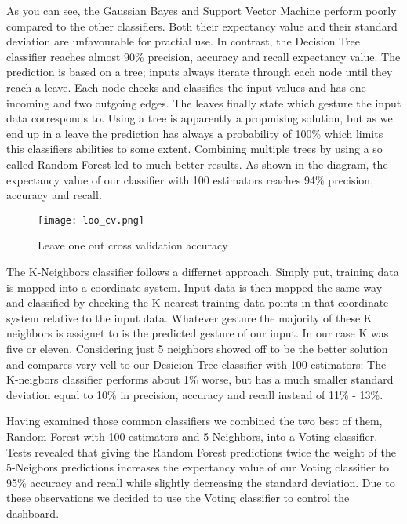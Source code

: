 As you can see, the Gaussian Bayes and Support Vector Machine perform poorly compared to the other classifiers. Both their expectancy value and their standard deviation are unfavourable for practial use. In contrast, the Decision Tree classifier reaches almost 90\% precision, accuracy and recall expectancy value. The prediction is based on a tree; inputs always iterate through each node until they reach a leave. Each node checks and classifies the input values and has one incoming and two outgoing edges. The leaves finally state which gesture the input data corresponds to. Using a tree is apparently a propmising solution, but as we end up in a leave the prediction has always a probability of 100\% which limits this classifiers abilities to some extent. Combining multiple trees by using a so called Random Forest led to much better results. As shown in the diagram, the expectancy value of our classifier with 100 estimators reaches 94\% precision, accuracy and recall. 

\begin{wrapfigure}{R}{0.4\textwidth}
\centering
\texttt{[image: loo\_cv.png]}
\caption{Leave one out cross validation accuracy}\label{fig:loo}
\end{wrapfigure}

The K-Neighbors classifier follows a differnet approach. Simply put, training data is mapped into a coordinate system. Input data is then mapped the same way and classified by checking the K nearest training data points in that coordinate system relative to the input data. Whatever gesture the majority of these K neighbors is assignet to is the predicted gesture of our input. In our case K was five or eleven. Considering just 5 neighbors showed off to be the better solution and compares very vell to our Desicion Tree classifier with 100 estimators: The K-neigbors classifier performs about 1\% worse, but has a much smaller standard deviation equal to 10\% in precision, accuracy and recall instead of 11\% - 13\%.

Having examined those common classifiers we combined the two best of them, Random Forest with 100 estimators and 5-Neighbors, into a Voting classifier. Tests revealed that giving the Random Forest predictions twice the weight of the 5-Neigbors predictions increases the expectancy value of our Voting classifier to 95\% accuracy and recall while slightly decreasing the standard deviation. Due to these observations we decided to use the Voting classifier to control the dashboard.

